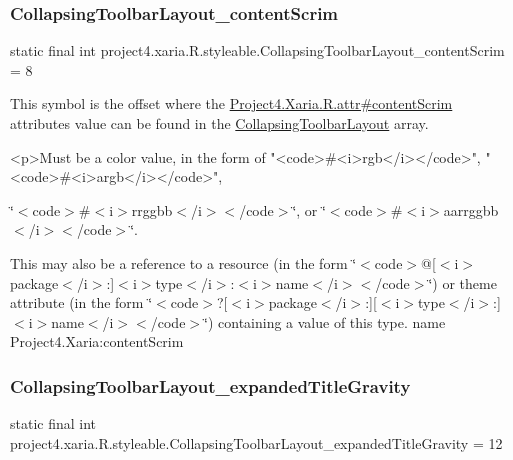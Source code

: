\subsubsection{\texorpdfstring{Collapsing\+Toolbar\+Layout\+\_\+content\+Scrim}{CollapsingToolbarLayout\_contentScrim}}
{\footnotesize\ttfamily static final int project4.\+xaria.\+R.\+styleable.\+Collapsing\+Toolbar\+Layout\+\_\+content\+Scrim = 8\hspace{0.3cm}{\ttfamily [static]}}

This symbol is the offset where the \hyperlink{}{Project4.\+Xaria.\+R.\+attr\#content\+Scrim} attribute\textquotesingle{}s value can be found in the \hyperlink{classproject4_1_1xaria_1_1R_1_1styleable_ac131ed2b7e0e7f05b58231242478b839}{Collapsing\+Toolbar\+Layout} array.

\begin{DoxyVerb}      <p>Must be a color value, in the form of "<code>#<i>rgb</i></code>", "<code>#<i>argb</i></code>",
\end{DoxyVerb}
 \char`\"{}$<$code$>$\#$<$i$>$rrggbb$<$/i$>$$<$/code$>$\char`\"{}, or \char`\"{}$<$code$>$\#$<$i$>$aarrggbb$<$/i$>$$<$/code$>$\char`\"{}. 

This may also be a reference to a resource (in the form \char`\"{}$<$code$>$@\mbox{[}$<$i$>$package$<$/i$>$\+:\mbox{]}$<$i$>$type$<$/i$>$\+:$<$i$>$name$<$/i$>$$<$/code$>$\char`\"{}) or theme attribute (in the form \char`\"{}$<$code$>$?\mbox{[}$<$i$>$package$<$/i$>$\+:\mbox{]}\mbox{[}$<$i$>$type$<$/i$>$\+:\mbox{]}$<$i$>$name$<$/i$>$$<$/code$>$\char`\"{}) containing a value of this type.  name Project4.\+Xaria\+:content\+Scrim \mbox{\label{classproject4_1_1xaria_1_1R_1_1styleable_a9a4dfbfaf067b89d3e998221b667aae4}} 
\subsubsection{\texorpdfstring{Collapsing\+Toolbar\+Layout\+\_\+expanded\+Title\+Gravity}{CollapsingToolbarLayout\_expandedTitleGravity}}
{\footnotesize\ttfamily static final int project4.\+xaria.\+R.\+styleable.\+Collapsing\+Toolbar\+Layout\+\_\+expanded\+Title\+Gravity = 12\hspace{0.3cm}{\ttfamily [static]}}


